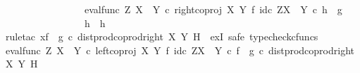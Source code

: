 \begin{isabellebody}
\ \ \ \ \ \ \ \ \ \ \ \ \ \ \ \ \ {\isacharparenleft}{\kern0pt}eval{\isacharunderscore}{\kern0pt}func\ Z\ {\isacharparenleft}{\kern0pt}X\ {\isasymCoprod}\ Y{\isacharparenright}{\kern0pt}\ {\isasymcirc}\isactrlsub c\ right{\isacharunderscore}{\kern0pt}coproj\ X\ Y\ {\isasymtimes}\isactrlsub f\ id\isactrlsub c\ {\isacharparenleft}{\kern0pt}Z\isactrlbsup {\isacharparenleft}{\kern0pt}X\ {\isasymCoprod}\ Y{\isacharparenright}{\kern0pt}\isactrlesup {\isacharparenright}{\kern0pt}{\isacharparenright}{\kern0pt}\isactrlsup {\isasymsharp}\ {\isasymcirc}\isactrlsub c\ h{}\ {\isacharequal}{\kern0pt}\ g\ {\isasymlongrightarrow}\isanewline
\ \ \ \ \ \ \ \ \ \ \ \ \ \ \ \ \ h{}\ {\isacharequal}{\kern0pt}\ h{\isacharparenright}{\kern0pt}{\isachardoublequoteclose}\isanewline
\ \ \ \ \isamarkupfalse%
\ {\isacharparenleft}{\kern0pt}rule{\isacharunderscore}{\kern0pt}tac\ x{\isacharequal}{\kern0pt}{\isachardoublequoteopen}{\isacharparenleft}{\kern0pt}f\isactrlsup {\isasymflat}\ {\isasymamalg}\ g\isactrlsup {\isasymflat}\ {\isasymcirc}\isactrlsub c\ dist{\isacharunderscore}{\kern0pt}prod{\isacharunderscore}{\kern0pt}coprod{\isacharunderscore}{\kern0pt}right\ X\ Y\ H{\isacharparenright}{\kern0pt}\isactrlsup {\isasymsharp}{\isachardoublequoteclose}\ \ exI{\isacharcomma}{\kern0pt}\ safe{\isacharcomma}{\kern0pt}\ typecheck{\isacharunderscore}{\kern0pt}cfuncs{\isacharparenright}{\kern0pt}\isanewline
\ \ \ \ \ \ \isamarkupfalse%
\ {\isachardoublequoteopen}{\isacharparenleft}{\kern0pt}eval{\isacharunderscore}{\kern0pt}func\ Z\ {\isacharparenleft}{\kern0pt}X\ {\isasymCoprod}\ Y{\isacharparenright}{\kern0pt}\ {\isasymcirc}\isactrlsub c\ left{\isacharunderscore}{\kern0pt}coproj\ X\ Y\ {\isasymtimes}\isactrlsub f\ id\isactrlsub c\ {\isacharparenleft}{\kern0pt}Z\isactrlbsup {\isacharparenleft}{\kern0pt}X\ {\isasymCoprod}\ Y{\isacharparenright}{\kern0pt}\isactrlesup {\isacharparenright}{\kern0pt}{\isacharparenright}{\kern0pt}\isactrlsup {\isasymsharp}\ {\isasymcirc}\isactrlsub c\ {\isacharparenleft}{\kern0pt}f\isactrlsup {\isasymflat}\ {\isasymamalg}\ g\isactrlsup {\isasymflat}\ {\isasymcirc}\isactrlsub c\ dist{\isacharunderscore}{\kern0pt}prod{\isacharunderscore}{\kern0pt}coprod{\isacharunderscore}{\kern0pt}right\ X\ Y\ H{\isacharparenright}{\kern0pt}\isactrlsup {\isasymsharp}\ {\isacharequal}{\kern0pt}\ \isanewline

\end{isabellebody}
